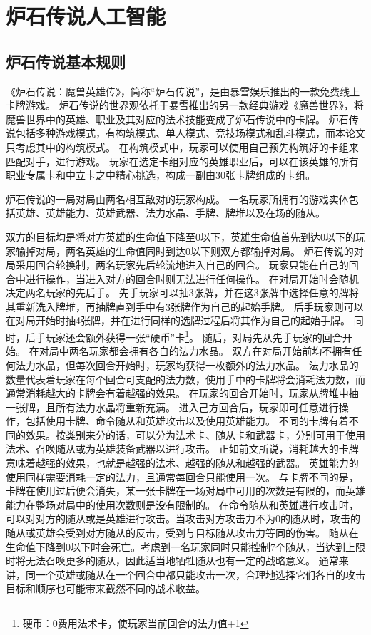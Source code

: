 \section{炉石传说人工智能}
\label{section:HearthstoneAI}
\subsection{炉石传说基本规则}
\label{section:HearthstoneRule}

《炉石传说：魔兽英雄传》，简称“炉石传说”，是由暴雪娱乐推出的一款免费线上卡牌游戏。
炉石传说的世界观依托于暴雪推出的另一款经典游戏《魔兽世界》，将魔兽世界中的英雄、职业及其对应的法术技能变成了炉石传说中的卡牌。
炉石传说包括多种游戏模式，有构筑模式、单人模式、竞技场模式和乱斗模式，而本论文只考虑其中的构筑模式。
在构筑模式中，玩家可以使用自己预先构筑好的卡组来匹配对手，进行游戏。
玩家在选定卡组对应的英雄职业后，可以在该英雄的所有职业专属卡和中立卡之中精心挑选，构成一副由30张卡牌组成的卡组。

炉石传说的一局对局由两名相互敌对的玩家构成。
一名玩家所拥有的游戏实体包括英雄、英雄能力、英雄武器、法力水晶、手牌、牌堆以及在场的随从。

双方的目标均是将对方英雄的生命值下降至0以下，英雄生命值首先到达0以下的玩家输掉对局，两名英雄的生命值同时到达0以下则双方都输掉对局。
炉石传说的对局采用回合轮换制，两名玩家先后轮流地进入自己的回合。
玩家只能在自己的回合中进行操作，当进入对方的回合时则无法进行任何操作。
在对局开始时会随机决定两名玩家的先后手。
先手玩家可以抽3张牌，并在这3张牌中选择任意的牌将其重新洗入牌堆，再抽牌直到手中有3张牌作为自己的起始手牌。
后手玩家则可以在对局开始时抽4张牌，并在进行同样的选牌过程后将其作为自己的起始手牌。
同时，后手玩家还会额外获得一张“硬币”卡\footnote{硬币：0费用法术卡，使玩家当前回合的法力值+1}。
随后，对局先从先手玩家的回合开始。
在对局中两名玩家都会拥有各自的法力水晶。
双方在对局开始前均不拥有任何法力水晶，但每次回合开始时，玩家均获得一枚额外的法力水晶。
法力水晶的数量代表着玩家在每个回合可支配的法力数，使用手中的卡牌将会消耗法力数，而通常消耗越大的卡牌会有着越强的效果。
在玩家的回合开始时，玩家从牌堆中抽一张牌，且所有法力水晶将重新充满。
进入己方回合后，玩家即可任意进行操作，包括使用卡牌、命令随从和英雄攻击以及使用英雄能力。
不同的卡牌有着不同的效果。按类别来分的话，可以分为法术卡、随从卡和武器卡，分别可用于使用法术、召唤随从或为英雄装备武器以进行攻击。
正如前文所说，消耗越大的卡牌意味着越强的效果，也就是越强的法术、越强的随从和越强的武器。
英雄能力的使用同样需要消耗一定的法力，且通常每回合只能使用一次。
与卡牌不同的是，卡牌在使用过后便会消失，某一张卡牌在一场对局中可用的次数是有限的，而英雄能力在整场对局中的使用次数则是没有限制的。
在命令随从和英雄进行攻击时，可以对对方的随从或是英雄进行攻击。当攻击对方攻击力不为0的随从时，攻击的随从或英雄会受到对方随从的反击，受到与目标随从攻击力等同的伤害。
随从在生命值下降到0以下时会死亡。考虑到一名玩家同时只能控制7个随从，当达到上限时将无法召唤更多的随从，因此适当地牺牲随从也有一定的战略意义。
通常来讲，同一个英雄或随从在一个回合中都只能攻击一次，合理地选择它们各自的攻击目标和顺序也可能带来截然不同的战术收益。

